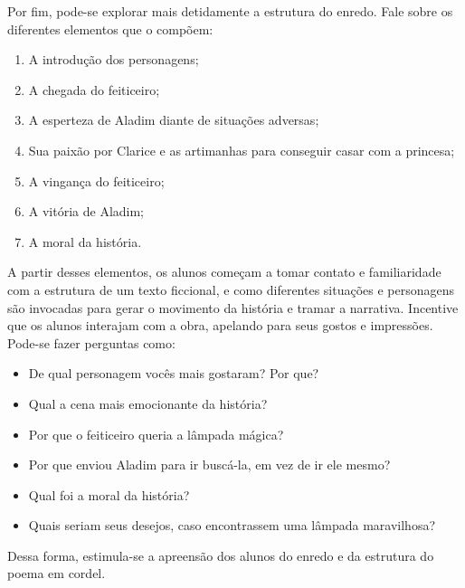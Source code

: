 \documentclass[11pt]{extarticle}
\begin{document}
Por fim, pode-se explorar mais detidamente a estrutura do enredo. Fale sobre os diferentes elementos que o compõem:

\begin{enumerate}
\item A introdução dos personagens;

\item A chegada do feiticeiro;

\item A esperteza de Aladim diante de situações adversas;

\item Sua paixão por Clarice e as artimanhas para conseguir casar com a princesa;

\item A vingança do feiticeiro;

\item A vitória de Aladim;

\item A moral da história.
\end{enumerate}


A partir desses elementos, os alunos começam a tomar contato e familiaridade com a estrutura de um texto ficcional, e como diferentes situações e personagens são invocadas para gerar o movimento da história e tramar a narrativa. Incentive que os alunos interajam com a obra, apelando para seus gostos e impressões.
Pode-se fazer perguntas como:

\begin{itemize}
\item De qual personagem vocês mais gostaram? Por que?

\item Qual a cena mais emocionante da história?

\item Por que o feiticeiro queria a lâmpada mágica?

\item Por que enviou Aladim para ir buscá-la, em vez de ir ele mesmo?

\item Qual foi a moral da história?

\item Quais seriam seus desejos, caso encontrassem uma lâmpada maravilhosa?
\end{itemize}

Dessa forma, estimula-se a apreensão dos alunos do enredo e da estrutura do poema em cordel.
\end{document}

